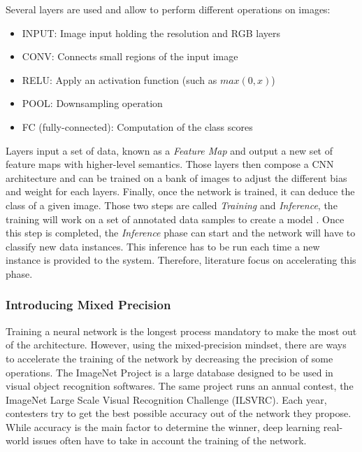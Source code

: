 
Several layers are used and allow to perform different operations on images:
\begin{itemize}
  \item INPUT: Image input holding the resolution and RGB layers
  \item CONV: Connects small regions of the input image
  \item RELU: Apply an activation function (such as $max(0,x)$)
  \item POOL: Downsampling operation
  \item FC (fully-connected): Computation of the class scores
\end{itemize}

Layers input a set of data, known as a \emph{Feature Map} and output a new set of feature maps with higher-level semantics. Those layers then compose a CNN architecture and can be trained on a bank of images to adjust the different bias and weight for each layers. Finally, once the network is trained, it can deduce the class of a given image. Those two steps are called \emph{Training} and \emph{Inference}, the training will work on a set of annotated data samples to create a model  \cite{Abdelouahab2018}. Once this step is completed, the \emph{Inference} phase can start and the network will have to classify new data instances. This inference has to be run each time a new instance is provided to the system. Therefore, literature focus on accelerating this phase.


\subsubsection{Introducing Mixed Precision}

Training a neural network is the longest process mandatory to make the most out of the architecture. However, using the mixed-precision mindset, there are ways to accelerate the training of the network by decreasing the precision of some operations. The ImageNet Project \cite{ImageNet2009} is a large database designed to be used in visual object recognition softwares. The same project runs an annual contest, the ImageNet Large Scale Visual Recognition Challenge (ILSVRC). Each year, contesters try to get the best possible accuracy out of the network they propose. While accuracy is the main factor to determine the winner, deep learning real-world issues often have to take in account the training of the network.

